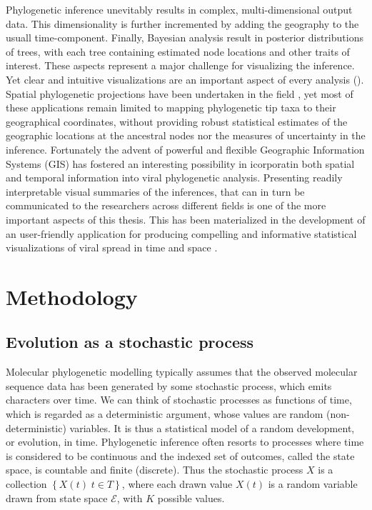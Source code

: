 \documentclass[12pt,twoside]{mitthesis}
\theoremstyle{plain}
\theoremstyle{definition}
\theoremstyle{remark}
\begin{document}
Phylogenetic inference unevitably results in complex, multi-dimensional output data.
This dimensionality is further incremented by adding the geography to the usuall time-component.
Finally, Bayesian analysis result in posterior distributions of trees, with each tree containing estimated node locations and other traits of interest.
These aspects represent a major challenge for visualizing the inference. 
Yet clear and intuitive visualizations are an important aspect of every analysis (\cite{Hadley10}).
Spatial phylogenetic projections have been undertaken in the field \citep{Kidd06,Parks09}, yet most of these applications remain limited to mapping phylogenetic tip taxa to their geographical coordinates, without providing robust statistical estimates of the geographic locations at the ancestral nodes nor the measures of uncertainty in the inference.
Fortunately the advent of powerful and flexible Geographic Information Systems (GIS) has fostered an interesting possibility in icorporatin both spatial and temporal information into viral phylogenetic analysis.
Presenting readily interpretable visual summaries of the inferences, that can in turn be communicated to the researchers across different fields is one of the more important aspects of this thesis.
This has been materialized in the development of an user-friendly application for producing compelling and informative statistical visualizations of viral spread in time and space \citep{Bielejec2011}.

\chapter{Methodology}

\section{Evolution as a stochastic process}

Molecular phylogenetic modelling typically assumes that the observed molecular sequence data has been generated by some stochastic process, which emits characters over time.
We can think of stochastic processes as functions of time, which is regarded as a deterministic argument, whose values are random (non-deterministic) variables. 
It is thus a statistical model of a random development, or evolution, in time.
Phylogenetic inference often resorts to processes where time is considered to be continuous and the indexed set of outcomes, called the state space, is countable and finite (discrete).
Thus the stochastic process $X$ is a collection $\left\{ X(t)\; t\in T\right\} $, where each drawn value $X(t)$ is a random variable drawn from state space $\mathcal{E}$, with $K$ possible values.
\end{document}
